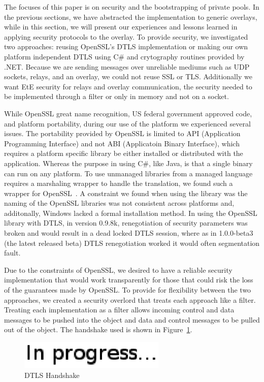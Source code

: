 \documentclass[conference]{IEEEtran}
\begin{document}
The focuses of this paper is on security and the bootstrapping of private pools.
In the previous sections, we have abstracted the implementation to generic
overlays, while in this section, we will present our experiences and lessons
learned in applying security protocols to the overlay.  To provide security, we
investigated two approaches:  reusing OpenSSL's DTLS implementation or making
our own platform independent DTLS using C\# and crytography routines provided
by .NET.  Because we are sending messages over unreliable mediums such as UDP
sockets, relays, and an overlay, we could not reuse SSL or TLS.  Additionally
we want EtE security for relays and overlay communication, the security needed
to be implemented through a filter or only in memory and not on a socket.

While OpenSSL great name recognition, US federal government approved code, and 
platform portability, during our use of the platform we experienced several
issues.  The portability provided by OpenSSL is limited to API (Application
Programming Interface) and not ABI (Applicatoin Binary Interface), which
requires a platform specific library be either installed or distributed with
the application.  Whereas the purpose in using C\#, like Java, is that a single
binary can run on any platform.  To use unmanaged libraries from a managed
language requires a marshaling wrapper to handle the translation, we found
such a wrapper for OpenSSL~\cite{openssl.net}.  A constraint we found when
using the library was the naming of the OpenSSL libraries was not consistent
across platforms and, additonally, Windows lacked a formal installation method.
In using the OpenSSL library with DTLS, in version 0.9.8k, renegotiation of
security parameters  was broken and would result in a dead locked DTLS session,
where as in 1.0.0-beta3 (the latest released beta) DTLS renegotiation worked
it would often segmentation fault.

Due to the constraints of OpenSSL, we desired to have a reliable security
implementation that would work transparently for those that could risk the
loss of the guarantees made by OpenSSL.  To provide for flexibility between
the two approaches, we created a security overlord that treats each approach
like a filter.  Treating each implementation as a filter allows incoming control
and data messages to be pushed into the object and data and control messages to
be pulled out of the object.  The handshake used is shown in
Figure~\ref{fig:dtls}.

\begin{figure}[h]
\centering
\includegraphics[width=2.75in]{in_progress.eps}
\caption{DTLS Handshake}
\label{fig:dtls}
\end{figure}
\end{document}
